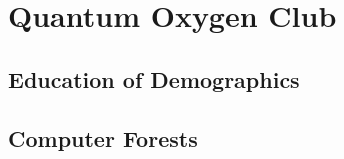 \chapter{Quantum Oxygen Club}\margintoc
\section{Education of Demographics}
\lipsum[1-6]
\section{Computer Forests}
\lipsum[1-7]